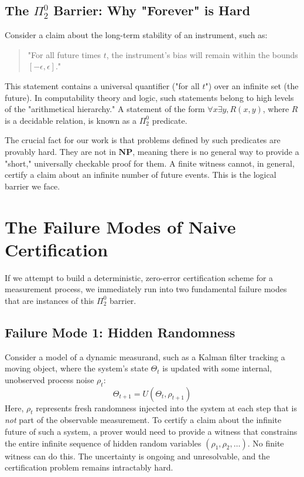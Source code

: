 \documentclass[12pt]{article}
\begin{document}
\subsection{The $\Pi^0_2$ Barrier: Why "Forever" is Hard}

Consider a claim about the long-term stability of an instrument, such as:
\begin{quote}
"For all future times $t$, the instrument's bias will remain within the bounds $[-\epsilon, \epsilon]$."
\end{quote}
This statement contains a universal quantifier ("for all $t$") over an infinite set (the future). In computability theory and logic, such statements belong to high levels of the "arithmetical hierarchy." A statement of the form $\forall x \exists y, R(x,y)$, where $R$ is a decidable relation, is known as a $\Pi^0_2$ predicate.

The crucial fact for our work is that problems defined by such predicates are provably hard. They are not in $\mathbf{NP}$, meaning there is no general way to provide a "short," universally checkable proof for them. A finite witness cannot, in general, certify a claim about an infinite number of future events. This is the logical barrier we face.

\section{The Failure Modes of Naive Certification}

If we attempt to build a deterministic, zero-error certification scheme for a measurement process, we immediately run into two fundamental failure modes that are instances of this $\Pi^0_2$ barrier.

\subsection{Failure Mode 1: Hidden Randomness}
Consider a model of a dynamic measurand, such as a Kalman filter tracking a moving object, where the system's state $\Theta_t$ is updated with some internal, unobserved process noise $\rho_t$:
\[
\Theta_{t+1} = U(\Theta_t, \rho_{t+1})
\]
Here, $\rho_t$ represents fresh randomness injected into the system at each step that is \emph{not} part of the observable measurement. To certify a claim about the infinite future of such a system, a prover would need to provide a witness that constrains the entire infinite sequence of hidden random variables $(\rho_1, \rho_2, \dots)$. No finite witness can do this. The uncertainty is ongoing and unresolvable, and the certification problem remains intractably hard.
\end{document}
